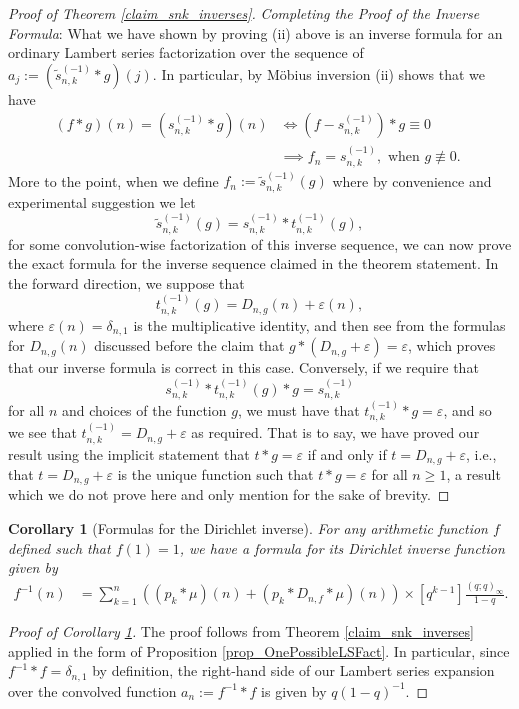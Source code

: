 \documentclass[12pt,reqno,a4letter]{article}
\numberwithin{figure}{section}
\numberwithin{table}{section}
\numberwithin{equation}{section}
\theoremstyle{plain}
\newtheorem{cor}[theorem]{Corollary}
\numberwithin{theorem}{section}
\theoremstyle{definition}
\begin{document}
\begin{proof}[Proof of Theorem \ref{claim_snk_inverses}]
\noindent
\textit{Completing the Proof of the Inverse Formula}: 
What we have shown by proving (ii) above is an inverse formula for an ordinary 
Lambert series factorization over the sequence of 
$a_j := (\widetilde{s}_{n,k}^{(-1)} \ast g)(j)$. 
In particular, by M\"obius inversion (ii) shows that we have 
\begin{align*} 
(f \ast g)(n) = (s_{n,k}^{(-1)} \ast g)(n) & \iff 
(f - s_{n,k}^{(-1)}) \ast g \equiv 0 \\ 
     & \implies 
     f_n = s_{n,k}^{(-1)}, \text{ when $g \not\equiv 0$. } 
\end{align*} 
More to the point, when we define $f_n := \widetilde{s}_{n,k}^{(-1)}(g)$ 
where by convenience and experimental suggestion we let 
$$\widetilde{s}_{n,k}^{(-1)}(g) = s_{n,k}^{(-1)} \ast t_{n,k}^{(-1)}(g),$$ 
for some convolution-wise factorization of this inverse sequence, we can now prove the 
exact formula for the inverse sequence claimed in the theorem statement. 
In the forward direction, we suppose that 
\[t_{n,k}^{(-1)}(g) = D_{n,g}(n) + \varepsilon(n),\] 
where $\varepsilon(n) = \delta_{n,1}$ 
is the multiplicative identity, and then see from the formulas for $D_{n,g}(n)$ discussed 
before the claim that $g \ast (D_{n,g}+\varepsilon) = \varepsilon$, which proves that 
our inverse formula is correct in this case. 
Conversely, if we require that 
\[
s_{n,k}^{(-1)} \ast t_{n,k}^{(-1)}(g) \ast g = s_{n,k}^{(-1)} 
\] 
for all $n$ and choices of the function $g$, we must have that 
$t_{n,k}^{(-1)} \ast g = \varepsilon$, and so we see that 
$t_{n,k}^{(-1)} = D_{n,g} + \varepsilon$ as required. 
That is to say, we have proved our result using the implicit statement that 
$t \ast g = \varepsilon$ if and only if $t = D_{n,g} + \varepsilon$, i.e., 
that $t = D_{n,g} + \varepsilon$ is the unique function such that 
$t \ast g = \varepsilon$ for all $n \geq 1$, 
a result which we do not prove here and only mention for the sake of brevity. 
\end{proof}

\begin{cor}[Formulas for the Dirichlet inverse] 
\label{cor_FormulasForTheDirichletInverse_v1}
For any arithmetic function $f$ defined such that $f(1) = 1$, we have 
a formula for its Dirichlet inverse function given by 
\begin{align*}
f^{-1}(n) & = \sum_{k=1}^n \left((p_k \ast \mu)(n) + (p_k \ast D_{n,f} \ast \mu)(n)\right) \times 
     [q^{k-1}] \frac{(q; q)_{\infty}}{1-q}. 
\end{align*} 
\end{cor} 
\begin{proof}[Proof of Corollary \ref{cor_FormulasForTheDirichletInverse_v1}]
The proof follows from Theorem \ref{claim_snk_inverses} applied in the form of 
Proposition \ref{prop_OnePossibleLSFact}. In particular, since 
$f^{-1} \ast f = \delta_{n,1}$ by definition, the right-hand side of our Lambert series expansion 
over the convolved function $a_n := f^{-1} \ast f$ is given by $q (1-q)^{-1}$. 
\end{proof} 
\end{document}
